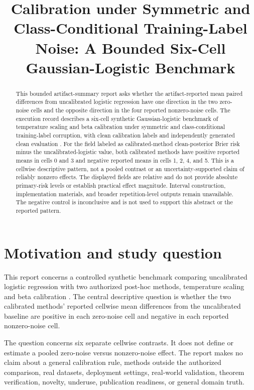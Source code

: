 \documentclass{article}
\title{Calibration under Symmetric and Class-Conditional Training-Label Noise: A Bounded Six-Cell Gaussian-Logistic Benchmark}
\author{}
\date{}
\begin{document}
\maketitle

\begin{abstract}
This bounded artifact-summary report asks whether the artifact-reported mean paired differences from uncalibrated logistic regression have one direction in the two zero-noise cells and the opposite direction in the four reported nonzero-noise cells. The execution record describes a six-cell synthetic Gaussian-logistic benchmark of temperature scaling and beta calibration under symmetric and class-conditional training-label corruption, with clean calibration labels and independently generated clean evaluation \cite{exec}. For the field labeled as calibrated-method clean-posterior Brier risk minus the uncalibrated-logistic value, both calibrated methods have positive reported means in cells 0 and 3 and negative reported means in cells 1, 2, 4, and 5. This is a cellwise descriptive pattern, not a pooled contrast or an uncertainty-supported claim of reliably nonzero effects. The displayed fields are relative and do not provide absolute primary-risk levels or establish practical effect magnitude. Interval construction, implementation materials, and broader repetition-level outputs remain unavailable. The negative control is inconclusive and is not used to support this abstract or the reported pattern.
\end{abstract}

\section{Motivation and study question}
This report concerns a controlled synthetic benchmark comparing uncalibrated logistic regression with two authorized post-hoc methods, temperature scaling and beta calibration \cite{exec}. The central descriptive question is whether the two calibrated methods' reported cellwise mean differences from the uncalibrated baseline are positive in each zero-noise cell and negative in each reported nonzero-noise cell.

The question concerns six separate cellwise contrasts. It does not define or estimate a pooled zero-noise versus nonzero-noise effect. The report makes no claim about a general calibration rule, methods outside the authorized comparison, real datasets, deployment settings, real-world validation, theorem verification, novelty, underuse, publication readiness, or general domain truth.
\end{document}
